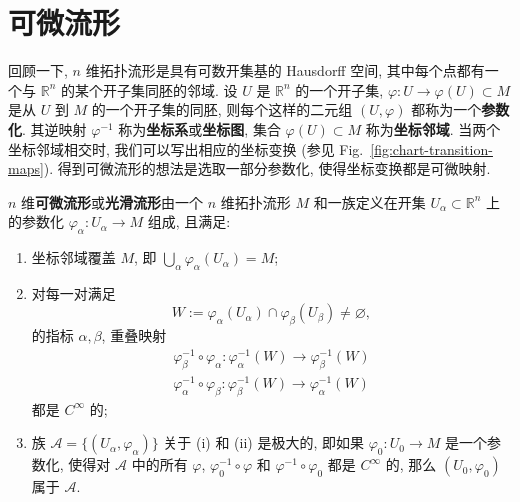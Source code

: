 \section{可微流形}\label{sec:differentiable-manifolds}

回顾一下, $n$ 维拓扑流形是具有可数开集基的 Hausdorff 空间, 其中每个点都有一个与 $\mathbb{R}^n$ 的某个开子集同胚的邻域. 设 $U$ 是 $\mathbb{R}^n$ 的一个开子集, $\varphi:U\to\varphi(U)\subset M$ 是从 $U$ 到 $M$ 的一个开子集的同胚, 则每个这样的二元组 $(U,\varphi)$ 都称为一个\textbf{参数化}. 其逆映射 $\varphi^{-1}$ 称为\textbf{坐标系}或\textbf{坐标图}, 集合 $\varphi(U)\subset M$ 称为\textbf{坐标邻域}. 当两个坐标邻域相交时, 我们可以写出相应的坐标变换 (参见 Fig.~\ref{fig:chart-transition-maps}). 得到可微流形的想法是选取一部分参数化, 使得坐标变换都是可微映射.


\begin{RiemannDefinition}\label{def:differentiable-manifold}
$n$ 维\textbf{可微流形}或\textbf{光滑流形}由一个 $n$ 维拓扑流形 $M$ 和一族定义在开集 $U_\alpha\subset\mathbb{R}^n$ 上的参数化 $\varphi_\alpha:U_\alpha\to M$ 组成, 且满足:
\begin{enumerate}[label=(\roman*),leftmargin=*]
\item 坐标邻域覆盖 $M$, 即 $\bigcup_\alpha\varphi_\alpha(U_\alpha)=M$;
\item 对每一对满足
\[
  W:=\varphi_\alpha(U_\alpha)\cap\varphi_\beta(U_\beta)\ne\varnothing,
\]
的指标 $\alpha,\beta$, 重叠映射
\begin{gather*}
  \varphi_\beta^{-1}\circ\varphi_\alpha:\varphi_\alpha^{-1}(W)\to\varphi_\beta^{-1}(W)\\
  \varphi_\alpha^{-1}\circ\varphi_\beta:\varphi_\beta^{-1}(W)\to\varphi_\alpha^{-1}(W)
\end{gather*}
都是 $C^\infty$ 的;
\item 族 $\mathcal{A}=\{(U_\alpha,\varphi_\alpha)\}$ 关于 (i) 和 (ii) 是极大的, 即如果 $\varphi_0:U_0\to M$ 是一个参数化, 使得对 $\mathcal{A}$ 中的所有 $\varphi$, $\varphi_0^{-1}\circ\varphi$ 和 $\varphi^{-1}\circ\varphi_0$ 都是 $C^\infty$ 的, 那么 $(U_0,\varphi_0)$ 属于 $\mathcal{A}$.
\end{enumerate}
\end{RiemannDefinition}

